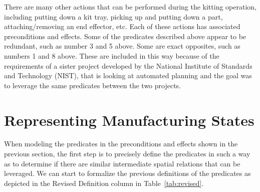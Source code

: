 \documentclass[preprint,12pt]{elsarticle}
\begin{document}
There are many other actions that can be performed during the kitting operation, including putting down a kit tray, picking up and putting down a part, attaching/removing an end effector, etc. Each of these actions has associated preconditions and effects. Some of the predicates described above appear to be redundant, such as number 3 and 5 above. Some are exact opposites, such as numbers 1 and 8 above. These are included in this way because of the requirements of a sister project developed by the National Institute of Standards and Technology (NIST), that is looking at automated planning and the goal was to leverage the same predicates between the two projects.

\section{Representing Manufacturing States}\label{S:section4}
When modeling the predicates in the preconditions and effects shown in the previous section, the first step is to precisely define the predicates in such a way as to determine if there are similar intermediate spatial relations that can be leveraged. We can start to formalize the previous definitions of the predicates as depicted in the Revised Definition column in Table~\ref{tab:revised}.
\end{document}
